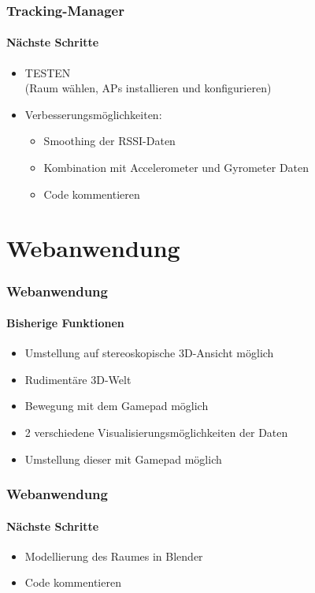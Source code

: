 \documentclass{beamer}
\begin{document}
\begin{frame}
\frametitle{Tracking-Manager}
\framesubtitle{N\"achste Schritte}
\begin{itemize}
  \item TESTEN\\
  		(Raum w\"ahlen, APs installieren und konfigurieren)
  \item Verbesserungsm\"oglichkeiten:
  		\begin{itemize}
  		\item	Smoothing der RSSI-Daten
  		\item	Kombination mit Accelerometer und Gyrometer Daten
      \item Code kommentieren
  		\end{itemize}
\end{itemize}
\end{frame}


\section{Webanwendung}

\begin{frame}
\frametitle{Webanwendung}
\framesubtitle{Bisherige Funktionen}
\begin{itemize}
  \item Umstellung auf stereoskopische 3D-Ansicht m\"oglich
  \item Rudiment\"are 3D-Welt
  \item Bewegung mit dem Gamepad m\"oglich
  \item 2 verschiedene Visualisierungsm\"oglichkeiten der Daten
  \item Umstellung dieser mit Gamepad m\"oglich
\end{itemize}
\end{frame}

\begin{frame}
\frametitle{Webanwendung}
\framesubtitle{N\"achste Schritte}
\begin{itemize}
  \item Modellierung des Raumes in Blender
  \item Code kommentieren
\end{itemize}
\end{frame}
\end{document}

